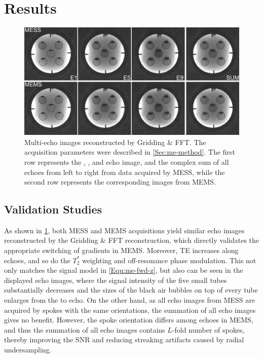 \section{Results}

\begin{figure}[tb]
  \centering
  \includegraphics[width=\textwidth]{fig/multi-echo-pha-grid.png}
  \caption{Multi-echo images reconstructed by Gridding \& FFT. The acquisition parameters were described in \cref{Sec:me-method}. The first row represents the , , and  echo image, and the complex sum of all echoes from left to right from data acquired by MESS, while the second row represents the corresponding images from MEMS.} \label{Fig:multi-echo-pha-grid}
\end{figure}
\subsection{Validation Studies}
As shown in \cref{Fig:multi-echo-pha-grid}, both MESS and MEMS acquisitions yield similar echo images reconstructed by the Gridding \& FFT reconstruction, which directly validates the appropriate switching of gradients in MEMS. Moreover, TE increases along echoes, and so do the $T_2^*$ weighting and off-resonance phase modulation. This not only matches the signal model in \cref{Equ:me-fwd-z}, but also can be seen in the displayed echo images, where the signal intensity of the five small tubes substantially decreases and the sizes of the black air bubbles on top of every tube enlarges from the  to  echo. On the other hand, as all echo images from MESS are acquired by spokes with the same orientations, the summation of all echo images gives no benefit. However, the spoke orientation differs among echoes in MEMS, and thus the summation of all echo images contains $L$-fold number of spokes, thereby improving the SNR and reducing streaking artifacts caused by radial undersampling. 


